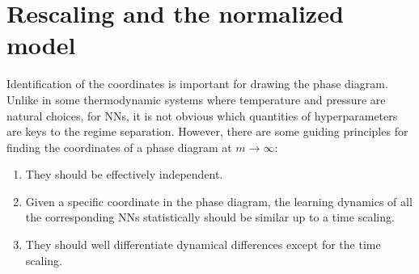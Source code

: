 \documentclass{article}
\begin{document}
\section{Rescaling and the normalized model}\label{sec..Rescaling}
Identification of the coordinates is important for drawing the phase diagram. Unlike in some thermodynamic systems where temperature and pressure are natural choices, for NNs, it is not obvious which quantities of hyperparameters are keys to the regime separation. However, there are some guiding principles for finding the coordinates of a phase diagram at $m\to\infty$:
\begin{enumerate}[label=(\roman*)]
    \item They should be effectively independent.
    \item Given a specific coordinate in the phase diagram, the learning dynamics of all the corresponding NNs statistically should be similar up to a time scaling.
    \item They should well differentiate dynamical differences except for the time scaling.
\end{enumerate}
\end{document}
